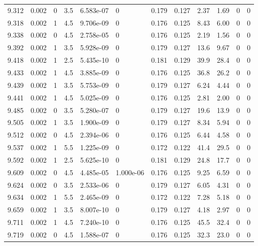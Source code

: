 \documentclass[preview]{standalone}
\begin{document}
{{{{{{{{{\begin{tabular}{L{1.2cm}C{1.2cm} C{0.3cm}C{0.5cm} C{1.4cm}C{1.4cm} C{1.4cm}C{1.4cm} C{1.6cm}C{1.6cm} C{1.6cm}C{1.6cm}}
  9.312  &  0.002  & 0     & 3.5 &  6.583e-07  & 0  &  0.179&   0.127& 2.37 & 1.69   &  0 & 0  \\ 
  9.318  &  0.002  & 1     & 4.5 &  9.706e-09  & 0  &  0.176&   0.125& 8.43 & 6.00   &  0 & 0  \\ 
  9.338  &  0.002  & 0     & 4.5 &  2.758e-05  & 0  &  0.176&   0.125& 2.19 & 1.56   &  0 & 0  \\ 
  9.392  &  0.002  & 1     & 3.5 &  5.928e-09  & 0  &  0.179&   0.127& 13.6 & 9.67   &  0 & 0  \\ 
  9.418  &  0.002  & 1     & 2.5 &  5.435e-10  & 0  &  0.181&   0.129& 39.9 & 28.4   &  0 & 0  \\ 
  9.433  &  0.002  & 1     & 4.5 &  3.885e-09  & 0  &  0.176&   0.125& 36.8 & 26.2   &  0 & 0  \\ 
  9.439  &  0.002  & 1     & 3.5 &  5.753e-09  & 0  &  0.179&   0.127& 6.24 & 4.44   &  0 & 0  \\ 
  9.441  &  0.002  & 1     & 4.5 &  5.025e-09  & 0  &  0.176&   0.125& 2.81 & 2.00   &  0 & 0  \\ 
  9.485  &  0.002  & 0     & 3.5 &  5.280e-07  & 0  &  0.179&   0.127& 19.6 & 13.9   &  0 & 0  \\ 
  9.505  &  0.002  & 1     & 3.5 &  1.900e-09  & 0  &  0.179&   0.127& 8.34 & 5.94   &  0 & 0  \\ 
  9.512  &  0.002  & 0     & 4.5 &  2.394e-06  & 0  &  0.176&   0.125& 6.44 & 4.58   &  0 & 0  \\ 
  9.537  &  0.002  & 1     & 5.5 &  1.225e-09  & 0  &  0.172&   0.122& 41.4 & 29.5   &  0 & 0  \\ 
  9.592  &  0.002  & 1     & 2.5 &  5.625e-10  & 0  &  0.181&   0.129& 24.8 & 17.7   &  0 & 0  \\ 
  9.609  &  0.002  & 0     & 4.5 &  4.485e-05  & 1.000e-06  &  0.176&   0.125& 9.25 & 6.59   &  0 & 0  \\ 
  9.624  &  0.002  & 0     & 3.5 &  2.533e-06  & 0  &  0.179&   0.127& 6.05 & 4.31   &  0 & 0  \\ 
  9.634  &  0.002  & 1     & 5.5 &  2.465e-09  & 0  &  0.172&   0.122& 7.28 & 5.18   &  0 & 0  \\ 
  9.659  &  0.002  & 1     & 3.5 &  8.007e-10  & 0  &  0.179&   0.127& 4.18 & 2.97   &  0 & 0  \\ 
  9.711  &  0.002  & 1     & 4.5 &  7.240e-10  & 0  &  0.176&   0.125& 45.5 & 32.4   &  0 & 0  \\ 
  9.719  &  0.002  & 0     & 4.5 &  1.588e-07  & 0  &  0.176&   0.125& 32.3 & 23.0   &  0 & 0  \\ 

\end{tabular}}}}}}}}}}
\end{document}
